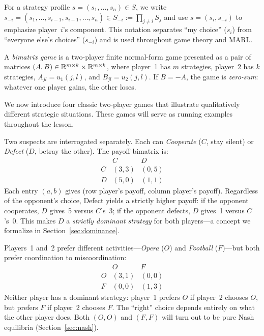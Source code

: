 \documentclass[11pt,a4paper]{article}
\begin{document}
\begin{remark}[Notation]
\label{rem:notation}
For a strategy profile $s = (s_1, \ldots, s_n) \in S$, we write
$s_{-i} = (s_1, \ldots, s_{i-1}, s_{i+1}, \ldots, s_n) \in
S_{-i} := \prod_{j \neq i} S_j$
and use $s = (s_i, s_{-i})$ to emphasize player~$i$'s component.  This
notation separates ``my choice'' ($s_i$) from ``everyone else's choices''
($s_{-i}$) and is used throughout game theory and MARL.
\end{remark}

\begin{definition}
\label{def:bimatrix}
A \emph{bimatrix game} is a two-player finite normal-form game presented as a
pair of matrices $(A, B) \in \mathbb{R}^{m \times k} \times \mathbb{R}^{m \times k}$, where
player~1 has $m$ strategies, player~2 has $k$ strategies, $A_{jl} = u_1(j,l)$,
and $B_{jl} = u_2(j,l)$.  If $B = -A$, the game is \emph{zero-sum}:
whatever one player gains, the other loses.
\end{definition}

We now introduce four classic two-player games that illustrate qualitatively
different strategic situations.  These games will serve as running examples
throughout the lesson.

\begin{example}
\label{ex:pd}
Two suspects are interrogated separately.  Each can \emph{Cooperate} ($C$,
stay silent) or \emph{Defect} ($D$, betray the other).  The payoff bimatrix
is:
\[
\begin{array}{c|cc}
    & C & D \\ \hline
  C & (3,3) & (0,5) \\
  D & (5,0) & (1,1)
\end{array}
\]
Each entry $(a,b)$ gives (row player's payoff, column player's payoff).
Regardless of the opponent's choice, Defect yields a strictly higher payoff:
if the opponent cooperates, $D$ gives~5 versus $C$'s~3; if the opponent
defects, $D$ gives~1 versus $C$'s~0.  This makes $D$ a
\emph{strictly dominant strategy} for both players---a concept we formalize
in Section~\ref{sec:dominance}.
\end{example}

\begin{example}
\label{ex:bos}
Players~1 and~2 prefer different activities---\emph{Opera} ($O$) and
\emph{Football} ($F$)---but both prefer coordination to miscoordination:
\[
\begin{array}{c|cc}
    & O & F \\ \hline
  O & (3,1) & (0,0) \\
  F & (0,0) & (1,3)
\end{array}
\]
Neither player has a dominant strategy: player~1 prefers $O$ if player~2
chooses $O$, but prefers $F$ if player~2 chooses $F$.  The ``right'' choice
depends entirely on what the other player does.  Both $(O,O)$ and $(F,F)$
will turn out to be pure Nash equilibria (Section~\ref{sec:nash}).
\end{example}
\end{document}
